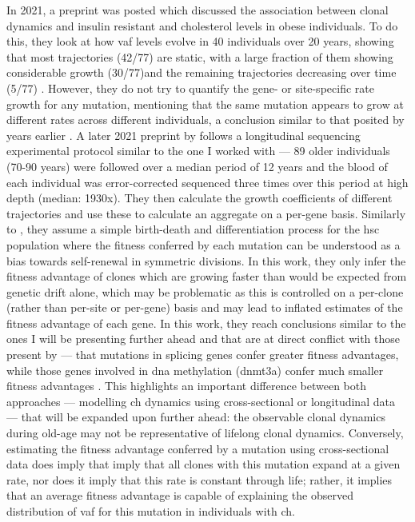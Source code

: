 In 2021, a preprint was posted which discussed the association between clonal dynamics and insulin resistant and cholesterol levels in obese individuals. To do this, they look at how \ac{vaf} levels evolve in 40 individuals over 20 years, showing that most trajectories (42/77) are static, with a large fraction of them showing considerable growth (30/77)and the remaining trajectories decreasing over time (5/77) \cite{Van_Deuren2021-ll}. However, they do not try to quantify the gene- or site-specific rate growth for any mutation, mentioning that the same mutation appears to grow at different rates across different individuals, a conclusion similar to that posited by  years earlier \cite{Young2016-du}. A later 2021 preprint by  follows a longitudinal sequencing experimental protocol similar to the one I worked with --- 89 older individuals (70-90 years) were followed over a median period of 12 years and the blood of each individual was error-corrected sequenced three times over this period at high depth (median: 1930x). They then calculate the growth coefficients of different trajectories and use these to calculate an aggregate on a per-gene basis. Similarly to \cite{Watson2020-pz}, they assume a simple birth-death and differentiation process for the \ac{hsc} population where the fitness conferred by each mutation can be understood as a bias towards self-renewal in symmetric divisions. In this work, they only infer the fitness advantage of clones which are growing faster than would be expected from genetic drift alone, which may be problematic as this is controlled on a per-clone (rather than per-site or per-gene) basis and may lead to inflated estimates of the fitness advantage of each gene. In this work, they reach conclusions similar to the ones I will be presenting further ahead and that are at direct conflict with those present by \cite{Watson2020-pz} --- that mutations in splicing genes confer greater fitness advantages, while those genes involved in \ac{dna} methylation (\ac{dnmt3a}) confer much smaller fitness advantages \cite{Robertson2021-sw}. This highlights an important difference between both approaches --- modelling \ac{ch} dynamics using cross-sectional or longitudinal data --- that will be expanded upon further ahead: the observable clonal dynamics during old-age may not be representative of lifelong clonal dynamics. Conversely, estimating the fitness advantage conferred by a mutation using cross-sectional data does imply that imply that all clones with this mutation expand at a given rate, nor does it imply that this rate is constant through life; rather, it implies that an average fitness advantage is capable of explaining the observed distribution of \ac{vaf} for this mutation in individuals with \ac{ch}.

